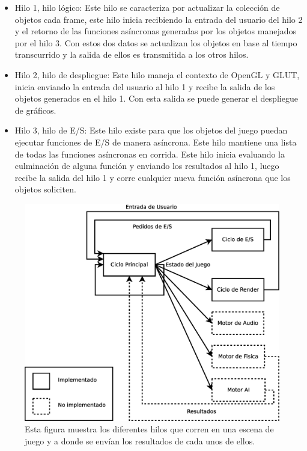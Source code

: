 \begin{itemize}
\item Hilo 1, hilo lógico: Este hilo se caracteriza por actualizar la colección de objetos cada frame, este hilo inicia recibiendo la entrada del usuario del hilo 2 y el retorno de las funciones asíncronas generadas por los objetos manejados por el hilo 3. Con estos dos datos se actualizan los objetos en base al tiempo transcurrido y la salida de ellos es transmitida a los otros hilos.
\item Hilo 2, hilo de despliegue: Este hilo maneja el contexto de OpenGL y GLUT, inicia enviando la entrada del usuario al hilo 1 y recibe la salida de los objetos generados en el hilo 1. Con esta salida se puede generar el despliegue de gráficos.
\item Hilo 3, hilo de E/S: Este hilo existe para que los objetos del juego puedan ejecutar funciones de E/S de manera asíncrona. Este hilo mantiene una lista de todas las funciones asíncronas en corrida. Este hilo inicia evaluando la culminación de alguna función y enviando los resultados al hilo 1, luego recibe la salida del hilo 1 y corre cualquier nueva función asíncrona que los objetos soliciten.
\end{itemize}

\begin{figure}[htbp!]
\centering
\includegraphics[width=1.0\textwidth]{ciclo_de_juego}
\caption[Ciclo de juego]{Esta figura muestra los diferentes hilos que corren en una escena de juego y a donde se envían los resultados de cada unos de ellos.}
\label{fig:ciclo_de_juego}
\end{figure}

